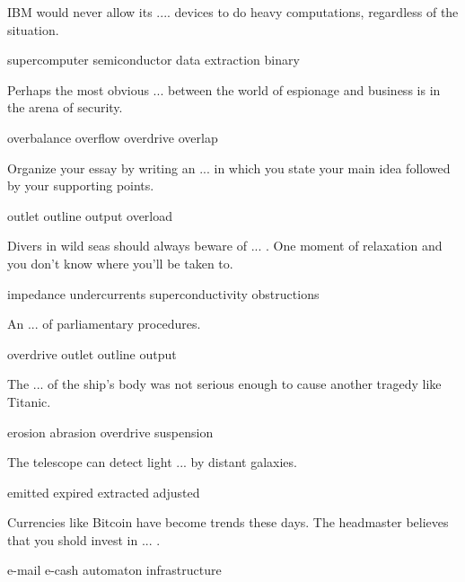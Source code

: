\documentclass{exam}
\begin{document}
\begin{questions}
\question IBM would never allow its  .... devices to do heavy computations, regardless of the situation.\\
\begin{oneparchoices} 
\correctchoice supercomputer
\choice semiconductor 
\choice data extraction
\choice binary 
\end{oneparchoices}
\question Perhaps the most obvious ... between the world of espionage and business is in the arena of security.\\
\begin{oneparchoices}
\choice overbalance
 \choice overflow
 \choice overdrive
 \correctchoice overlap
\end{oneparchoices}
\question Organize your essay by writing an ... in which you state your main idea followed by your supporting points.\\
\begin{oneparchoices}
\choice outlet
 \correctchoice outline
 \choice output
 \choice overload 
\end{oneparchoices}
\question Divers in wild seas should always beware of ... . One moment of relaxation and you don't know where you'll be taken to.\\
\begin{oneparchoices}
\choice impedance
\correctchoice undercurrents
\choice superconductivity
\choice obstructions 
\end{oneparchoices}
\question An ... of parliamentary procedures.\\
\begin{oneparchoices}
\choice overdrive
\choice outlet
\correctchoice outline
\choice output
\end{oneparchoices}
\question The ... of the ship's body was not serious enough to cause another tragedy like Titanic.\\
\begin{oneparchoices} 
\correctchoice erosion
 \choice abrasion 
 \choice overdrive
 \choice suspension
\end{oneparchoices}
\question The telescope can detect light ... by distant galaxies.\\
\begin{oneparchoices}
 \correctchoice emitted
 \choice expired 
 \choice extracted
 \choice adjusted
\end{oneparchoices}

\question Currencies like Bitcoin have become trends these days. The headmaster believes that you shold invest in ... .\\
\begin{oneparchoices}
\choice e-mail
\correctchoice e-cash
\choice automaton
\choice infrastructure


\end{oneparchoices}
\end{questions}
\end{document}
